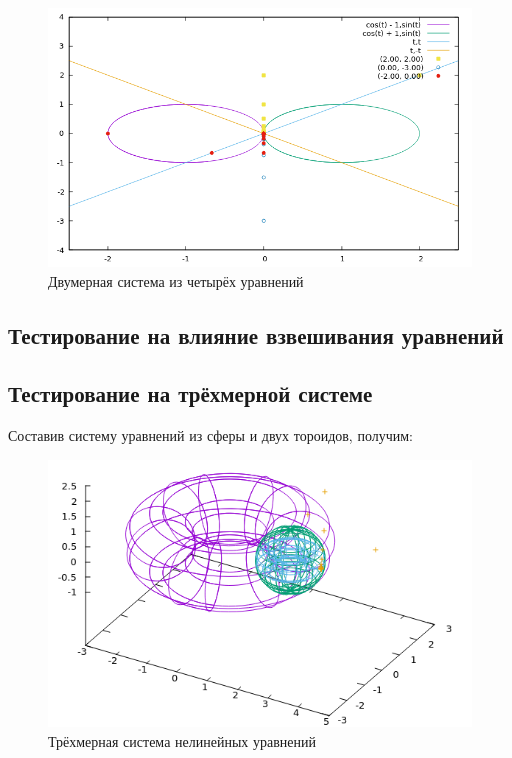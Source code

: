 \documentclass[12pt, a4paper]{article}
\begin{document}
\vspace{5mm}
\begin{figure}[H]
\centering
\includegraphics[scale=0.8]{5.png}
\caption{Двумерная система из четырёх уравнений}
\end{figure}
\vspace{5mm}

\subsection{Тестирование на влияние взвешивания уравнений}

\subsection{Тестирование на трёхмерной системе}
\noindent Составив систему уравнений из сферы и двух тороидов, получим:

\vspace{5mm}
\begin{figure}[H]
\centering
\includegraphics{10.png}
\caption{Трёхмерная система нелинейных уравнений}
\end{figure}
\vspace{5mm}
\end{document}
